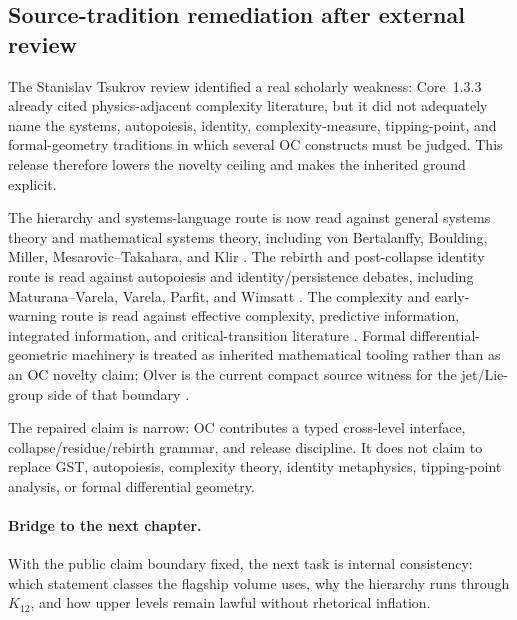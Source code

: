 \subsection{Source-tradition remediation after external review}
\label{sec:oc13-source-tradition-remediation-v3}

The Stanislav Tsukrov review identified a real scholarly weakness: Core~1.3.3
already cited physics-adjacent complexity literature, but it did not adequately
name the systems, autopoiesis, identity, complexity-measure, tipping-point, and
formal-geometry traditions in which several OC constructs must be judged. This
release therefore lowers the novelty ceiling and makes the inherited ground
explicit.

The hierarchy and systems-language route is now read against general systems
theory and mathematical systems theory, including von Bertalanffy,
Boulding, Miller, Mesarovic--Takahara, and Klir
\cite{bertalanffy_general_system_theory,boulding_general_systems_theory,miller_living_systems,mesarovic_takahara_general_systems,klir_architecture_systems}.
The rebirth and post-collapse identity route is read against autopoiesis and
identity/persistence debates, including Maturana--Varela, Varela, Parfit, and
Wimsatt \cite{maturana_varela_autopoiesis,varela_biological_autonomy,parfit_reasons_persons,wimsatt_reductionism_levels}.
The complexity and early-warning route is read against effective complexity,
predictive information, integrated information, and critical-transition
literature \cite{gell_mann_effective_complexity,bialek_predictability_complexity,tononi_information_integration,scheffer_critical_transitions,dakos_early_warning}.
Formal differential-geometric machinery is treated as inherited mathematical
tooling rather than as an OC novelty claim; Olver is the current compact source
witness for the jet/Lie-group side of that boundary \cite{olver_lie_groups}.

The repaired claim is narrow: OC contributes a typed cross-level interface,
collapse/residue/rebirth grammar, and release discipline. It does not claim to
replace GST, autopoiesis, complexity theory, identity metaphysics, tipping-point
analysis, or formal differential geometry.

\paragraph{Bridge to the next chapter.}
With the public claim boundary fixed, the next task is internal consistency:
which statement classes the flagship volume uses, why the hierarchy runs
through \(K_{12}\), and how upper levels remain lawful without rhetorical
inflation.

\clearpage
